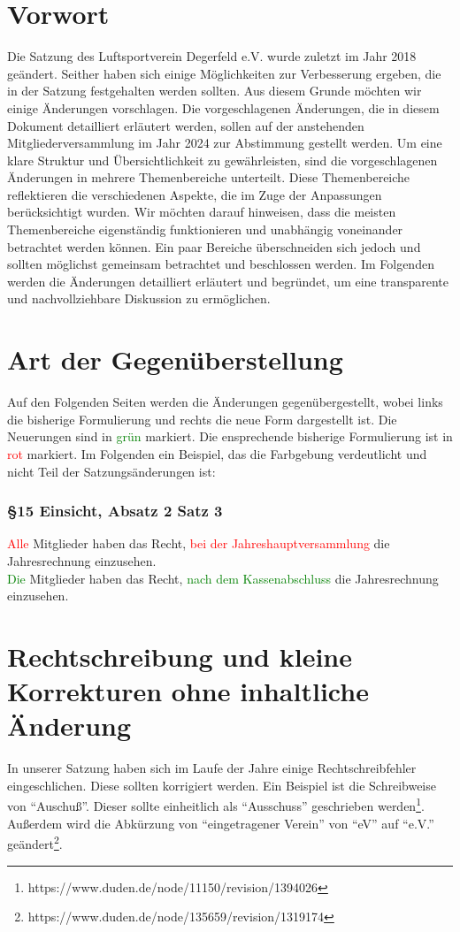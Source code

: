\documentclass[10pt,a4paper,parskip=half]{scrartcl}
\newcommand{\new}[1]{\textcolor{Green}{#1}}
\newcommand{\old}[1]{\textcolor{Red}{#1}}
\newcommand{\change}[1]{
  \begin{adjustwidth}{20pt}{20pt}
    #1
  \end{adjustwidth}
}
\newcommand{\compare}[3]{\change{\subsubsection*{#1}\begin{multicols}{2}#2\columnbreak\\#3\end{multicols}}}
\begin{document}
\clearpage


\section*{Vorwort}
Die Satzung des Luftsportverein Degerfeld e.V. wurde zuletzt im Jahr 2018 geändert. Seither haben sich einige Möglichkeiten zur Verbesserung ergeben, die in der Satzung festgehalten werden sollten. Aus diesem Grunde möchten wir einige Änderungen vorschlagen. Die vorgeschlagenen Änderungen, die in diesem Dokument detailliert erläutert werden, sollen auf der anstehenden Mitgliederversammlung im Jahr 2024 zur Abstimmung gestellt werden. Um eine klare Struktur und Übersichtlichkeit zu gewährleisten, sind die vorgeschlagenen Änderungen in mehrere Themenbereiche unterteilt. Diese Themenbereiche reflektieren die verschiedenen Aspekte, die im Zuge der Anpassungen berücksichtigt wurden. Wir möchten darauf hinweisen, dass die meisten Themenbereiche eigenständig funktionieren und unabhängig voneinander betrachtet werden können. Ein paar Bereiche überschneiden sich jedoch und sollten möglichst gemeinsam betrachtet und beschlossen werden. Im Folgenden werden die Änderungen detailliert erläutert und begründet, um eine transparente und nachvollziehbare Diskussion zu ermöglichen.


\tableofcontents
\clearpage

\section*{Art der Gegenüberstellung}

Auf den Folgenden Seiten werden die Änderungen gegenübergestellt, wobei links die bisherige Formulierung und rechts die neue Form dargestellt ist. Die Neuerungen sind in \new{grün} markiert. Die ensprechende bisherige Formulierung ist in \old{rot} markiert. Im Folgenden ein Beispiel, das die Farbgebung verdeutlicht und nicht Teil der Satzungsänderungen ist:

\compare{§15 Einsicht, Absatz 2 Satz 3}
{\old{Alle} Mitglieder haben das Recht, \old{bei der Jahreshauptversammlung} die Jahresrechnung einzusehen.}
{\new{Die} Mitglieder haben das Recht, \new{nach dem Kassenabschluss} die Jahresrechnung einzusehen.}


\section{Rechtschreibung und kleine Korrekturen ohne inhaltliche Änderung}
In unserer Satzung haben sich im Laufe der Jahre einige Rechtschreibfehler eingeschlichen. Diese sollten korrigiert werden.
Ein Beispiel ist die Schreibweise von "`Auschuß"'. Dieser sollte einheitlich als "`Ausschuss"' geschrieben werden\footnote{https://www.duden.de/node/11150/revision/1394026}.
Außerdem wird die Abkürzung von "`eingetragener Verein"' von "`eV"' auf "`e.V."' geändert\footnote{https://www.duden.de/node/135659/revision/1319174}.
\end{document}
